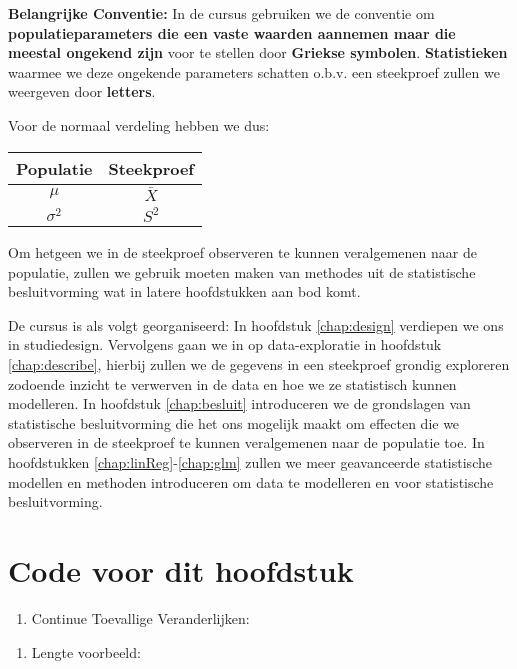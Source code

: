 \documentclass[
  12pt,dutch,coursenotes]{book}
\providecommand{\tightlist}{%
  \setlength{\itemsep}{0pt}\setlength{\parskip}{0pt}}
\theoremstyle{definition}
\theoremstyle{definition}
\theoremstyle{definition}
\theoremstyle{remark}
\begin{document}
\textbf{Belangrijke Conventie:} In de cursus gebruiken we de conventie om \textbf{populatieparameters die een vaste waarden aannemen maar die meestal ongekend zijn} voor te stellen door \textbf{Griekse symbolen}. \textbf{Statistieken} waarmee we deze ongekende parameters schatten o.b.v. een steekproef zullen we weergeven door \textbf{letters}.

Voor de normaal verdeling hebben we dus:

\begin{longtable}[]{@{}cc@{}}
\toprule
Populatie & Steekproef\tabularnewline
\midrule
\endhead
\(\mu\) & \(\bar X\)\tabularnewline
\(\sigma^2\) & \(S^2\)\tabularnewline
\bottomrule
\end{longtable}

Om hetgeen we in de steekproef observeren te kunnen veralgemenen naar de populatie, zullen we gebruik moeten maken van methodes uit de statistische besluitvorming wat in latere hoofdstukken aan bod komt.

De cursus is als volgt georganiseerd:
In hoofdstuk \ref{chap:design} verdiepen we ons in studiedesign. Vervolgens gaan we in op data-exploratie in hoofdstuk \ref{chap:describe}, hierbij zullen we de gegevens in een steekproef grondig exploreren zodoende inzicht te verwerven in de data en hoe we ze statistisch kunnen modelleren.
In hoofdstuk \ref{chap:besluit} introduceren we de grondslagen van statistische besluitvorming die het ons mogelijk maakt om effecten die we observeren in de steekproef te kunnen veralgemenen naar de populatie toe.
In hoofdstukken \ref{chap:linReg}-\ref{chap:glm} zullen we meer geavanceerde statistische modellen en methoden introduceren om data te modelleren en voor statistische besluitvorming.

\hypertarget{code-voor-dit-hoofdstuk}{%
\section{Code voor dit hoofdstuk}\label{code-voor-dit-hoofdstuk}}

\begin{enumerate}
\def\labelenumi{\arabic{enumi}.}
\tightlist
\item
  Continue Toevallige Veranderlijken:
\end{enumerate}

\begin{enumerate}
\def\labelenumi{\arabic{enumi}.}
\setcounter{enumi}{1}
\tightlist
\item
  Lengte voorbeeld:
\end{enumerate}
\end{document}
